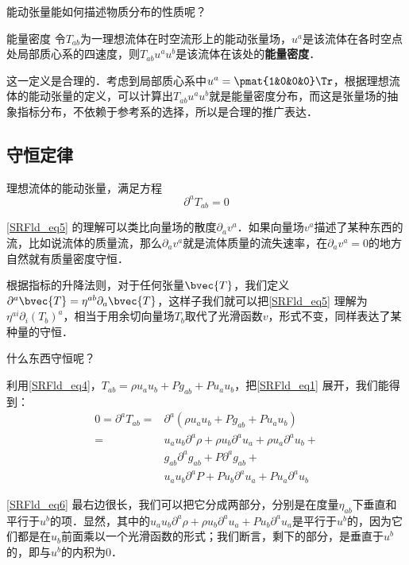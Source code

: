能动张量能如何描述物质分布的性质呢？

\begin{definition}{能量密度}
令$T_{ab}$为一理想流体在时空流形上的能动张量场，$u^a$是该流体在各时空点处局部质心系的四速度，则$T_{ab}u^au^b$是该流体在该处的\textbf{能量密度}．
\end{definition}

这一定义是合理的．考虑到局部质心系中$u^a=\pmat{1&0&0&0}\Tr$，根据理想流体的能动张量的定义，可以计算出$T_{ab}u^au^b$就是能量密度分布，而这是张量场的抽象指标分布，不依赖于参考系的选择，所以是合理的推广表达．

\subsection{守恒定律}

理想流体的能动张量，满足方程
\begin{equation}\label{SRFld_eq5}
\partial^aT_{ab}=0
\end{equation}

\autoref{SRFld_eq5} 的理解可以类比向量场的散度$\partial_av^a$．如果向量场$v^a$描述了某种东西的流，比如说流体的质量流，那么$\partial_av^a$就是流体质量的流失速率，在$\partial_av^a=0$的地方自然就有质量密度守恒．

根据指标的升降法则，对于任何张量$\bvec{T}$，我们定义$\partial^a\bvec{T}=\eta^{ab}\partial_a\bvec{T}$，这样子我们就可以把\autoref{SRFld_eq5} 理解为$\eta^{ai}\partial_i(T_b)^a$，相当于用余切向量场$T_b$取代了光滑函数$v$，形式不变，同样表达了某种量的守恒．

什么东西守恒呢？

利用\autoref{SRFld_eq4}，$T_{ab}=\rho u_au_b+P g_{ab}+P u_au_b$，把\autoref{SRFld_eq1} 展开，我们能得到：
\begin{equation}\label{SRFld_eq6}
\begin{aligned}
0=\partial^aT_{ab}=&\partial^a(\rho u_au_b+P g_{ab}+P u_au_b)\\
=&u_au_b\partial^a\rho+\rho u_b\partial^au_a+\rho u_a\partial^au_b+\\
&g_{ab}\partial^ag_{ab}+P\partial^ag_{ab}+\\
&u_au_b\partial^aP+P u_b\partial^au_a+P u_a\partial^au_b
\end{aligned}
\end{equation}

\autoref{SRFld_eq6} 最右边很长，我们可以把它分成两部分，分别是在度量$\eta_{ab}$下垂直和平行于$u^b$的项．显然，其中的$u_au_b\partial^a\rho+\rho u_b\partial^au_a+P u_b\partial^au_a$是平行于$u^b$的，因为它们都是在$u_b$前面乘以一个光滑函数的形式；我们断言，剩下的部分，是垂直于$u^b$的，即与$u^b$的内积为$0$．

